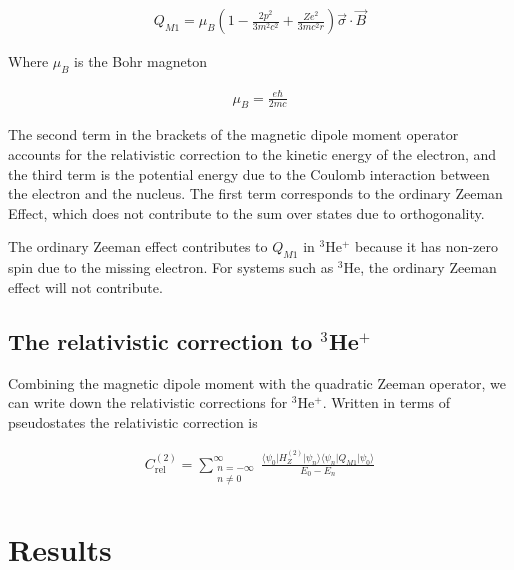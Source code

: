             \begin{align}
                Q_{M1} = \mu_B \left( 1 - \frac{2p^2}{3m^2 c^2} + \frac{Ze^2}{3mc^2r} \right) \vec{\sigma} \cdot \vec{B}
            \end{align}

            \noindent Where $\mu_B$ is the Bohr magneton
            
            \begin{align}
                \mu_B = \frac{e \hbar}{2mc}
            \end{align}

            \noindent The second term in the brackets of the magnetic dipole moment operator accounts for the relativistic correction to the kinetic energy of the electron, and the third term is the potential energy due to the Coulomb interaction between the electron and the nucleus. The first term corresponds to the ordinary Zeeman Effect, which does not contribute to the sum over states due to orthogonality.

            The ordinary Zeeman effect contributes to $Q_{M1}$ in $^3$He$^+$ because it has non-zero spin due to the missing electron. For systems such as $^3$He, the ordinary Zeeman effect will not contribute.

        \subsection{The relativistic correction to $^3$He$^+$}\label{sec:Relativistic_Correction}
            Combining the magnetic dipole moment with the quadratic Zeeman operator, we can write down the relativistic
            corrections for $^3$He$^+$. Written in terms of pseudostates the relativistic correction is

            \begin{align}
                C_{\text{rel}}^{(2)} =\sum_{\substack{n = -\infty \\ n \neq 0}}^{\infty}
                \frac{\langle \psi_0 \vert H_Z^{(2)} \vert \psi_n \rangle \langle \psi_n \vert Q_{M1} \vert \psi_0 \rangle}{E_0 - E_n}
            \end{align}


    \section{Results}\label{sec:results}





